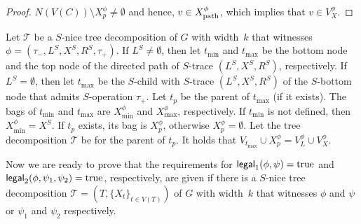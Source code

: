 \documentclass[a4paper,UKenglish,cleveref, autoref, thm-restate, numberwithinsect]{lipics-v2021}
\newcommand{\legal}{\mathsf{legal}}
\newcommand{\dpath}{\textup{path}}
\newcommand{\true}{\textup{true}}
\newcommand{\slim}{\text{slim}\xspace}
\newcommand{\topheavy}{\text{top-heavy}\xspace}
\begin{document}
\begin{proof}
$N(V(C))\setminus X^\phi_p\neq\emptyset$ and hence,  $v\in X^\phi_{\dpath}$, which implies that  $v\in V^\phi_X$.
    \end{proof}


\begin{corollary}\label{lem:legal0}
Let $\mathcal{T}$ be a \slim $S$-nice tree decomposition of $G$ with width~$k$ that witnesses $\phi=(\tau_-,L^S, X^S, R^S,\tau_+)$. 
If $L^S\neq\emptyset$, then let $t_{\min}$ and $t_{\max}$ be the bottom node and the top node of the directed path of $S$-trace $(L^S, X^S, R^S)$, respectively. 
If $L^S=\emptyset$, then let $t_{\max}$ be the $S$-child with $S$-trace $(L^S, X^S, R^S)$ of the $S$-bottom node that admits $S$-operation $\tau_+$. 
Let $t_p$ be the parent of $t_{\max}$ (if it exists). 
The bags of $t_{\min}$ and $t_{\max}$ are $X^\phi_{\min}$ and $X^\phi_{\max}$, respectively. If $t_{\min}$ is not defined, then $X^\phi_{\min}=X^S$.
If $t_p$ exists, its bag is $X^\phi_p$, otherwise $X^\phi_p=\emptyset$.
Let the tree decomposition $\mathcal{T}$ be \topheavy for the parent of $t_p$. 
It holds that 
$V_{t_{\max}}\cup X^\phi_p=V^\phi_L\cup V^\phi_X$.
\end{corollary}









Now we are ready to prove that the requirements for $\legal_1(\phi,\psi)=\true$ and $\legal_2(\phi,\psi_1,\psi_2)=\true$, respectively, are given if there is a \slim $S$-nice tree decomposition $\mathcal{T}=(T,\{X_t\}_{t\in V(T)})$ of $G$ with width~$k$ that witnesses $\phi$ and $\psi$ or $\psi_1$ and $\psi_2$ respectively.
\end{document}
